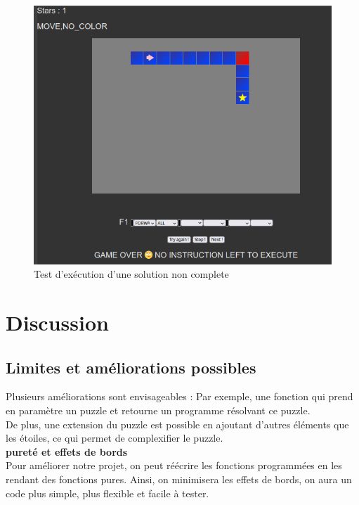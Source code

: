 \documentclass[11pt]{article}
\begin{document}
\begin{figure}[h!]
\begin{center}
\includegraphics[scale=0.3]{no_instr.png} 
\caption{Test d'exécution d'une solution non complete }
\end{center}
\end{figure}


\newpage


\section{Discussion}
\subsection{Limites et améliorations possibles}
Plusieurs améliorations sont envisageables : Par exemple, une fonction qui prend en paramètre un puzzle et retourne un programme résolvant ce puzzle.\\ De plus, une extension du puzzle est possible en ajoutant d'autres éléments que les étoiles, ce qui permet de complexifier le puzzle.\\
\textbf{pureté et effets de bords}\\
Pour améliorer notre projet, on peut réécrire les fonctions programmées en les rendant des fonctions pures. Ainsi, on minimisera les effets de bords, on aura un code plus simple, plus flexible et facile à tester.\\
\end{document}
